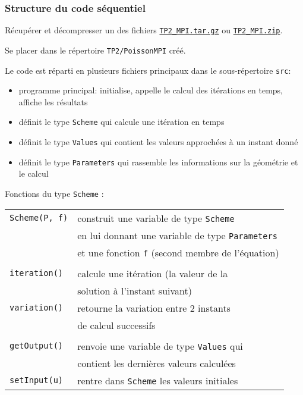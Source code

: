 \documentclass{beamer}
\begin{document}
\begin{frame}
	\frametitle{Structure du code séquentiel}
	
	Récupérer et décompresser un des fichiers \href{https://perso.ensta-paris.fr/~tajchman/Seance3/TP2_MPI.tar.gz}{\tt TP2\_MPI.tar.gz} ou \href{https://perso.ensta-paris.fr/~tajchman/Seance3/TP2_MPI.zip}{\tt TP2\_MPI.zip}.
	
    \medskip
	 Se placer dans le répertoire {\tt TP2/PoissonMPI} créé. 
	
	Le code est réparti en plusieurs fichiers principaux dans le sous-répertoire {\tt src}:
    \medskip
    
	\hfill\begin{minipage}{8cm}
	\begin{itemize}
		\item[\textcolor{blue}{main.cxx}:] programme principal: initialise, appelle le calcul des itérations en temps, affiche les résultats 
		\item[\textcolor{blue}{scheme(.hxx/.cxx)}:] définit le type {\tt Scheme} qui calcule une itération en temps
		\item[\textcolor{blue}{values(.hxx/.cxx)}:] définit le type {\tt Values} qui contient les valeurs approchées à un instant donné
		\item[\textcolor{blue}{parameters(.hxx/.cxx)}:] définit le type {\tt Parameters} qui rassemble les informations sur la géométrie et le calcul
	\end{itemize}
    \end{minipage}
\vfill
\end{frame}

\begin{frame}
Fonctions du type {\tt Scheme} :
\bigskip

\begin{tabular}{ll}
{\tt Scheme(P, f)} & construit une variable de type {\tt Scheme} \\
& en lui donnant une variable de type {\tt Parameters} \\
& et une fonction {\tt f} (second membre de l'équation) \\ \\
{\tt iteration()} & calcule une itération (la valeur de la \\ 
& solution à l'instant suivant)\\
{\tt variation()} & retourne la variation entre 2 instants \\ 
& de calcul successifs\\ \\

{\tt getOutput()} & renvoie une variable de type {\tt Values} qui \\ & contient les dernières valeurs calculées \\
{\tt setInput(u)} & rentre dans {\tt Scheme} les valeurs initiales \\
\end{tabular}
	
\end{frame}
\end{document}
